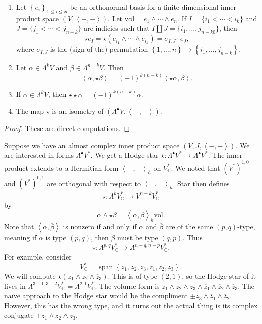 
\begin{proposition}\label{prp:5.0.6}
	\begin{enumerate}
		\item Let $\left\{ e_i \right\} _{1\leq i\leq n} $ be an orthonormal basis for a finite dimensional inner product space $(V,\left\langle -,- \right\rangle )$. Let $\mathrm{vol} =e_1 \wedge \cdots \wedge e_n$. If $I = \{i_1 < \cdots < i_k\}$ and $J = \{ j_1 < \cdots < j_{n-k} \}$ are indicies such that $I\amalg J=\{i_1, \ldots ,j_{n-k0} \}$, then
	\[
		\star e_I = \star \left( e_{i_1} \wedge \cdots \wedge e_{i_k}  \right) =\sigma _{I,J}\cdot  e_J,
	\]
	where $\sigma_{I,J} $ is the (sign of the) permutation $\left\{ 1, \ldots ,n \right\} \to \left\{ i_1, \ldots , j_{n-k}  \right\} $.
	\item Let $\alpha \in \Lambda ^kV$ and $\beta \in \Lambda ^{n-k} V$. Then
	\[
		\left\langle \alpha ,\star \beta  \right\rangle =(-1)^{k(n-k)} \left\langle \star \alpha ,\beta  \right\rangle 
	.\]
	\item If $\alpha \in \Lambda ^{k} V$, then $\star \star \alpha =(-1)^{k(n-k)} \alpha $.
	\item The map $\star $ is an isometry of $(\Lambda ^{\bullet} V,\left\langle -,- \right\rangle )$.
	\end{enumerate}
\end{proposition}
\begin{proof}
	These are direct computations.
\end{proof}


Suppose we have an almost complex inner product space $(V,J,\left\langle -,- \right\rangle )$. We are interested in forms $\Lambda ^{\bullet} V^*$. We get a Hodge star $\star : \Lambda ^{\bullet} V^* \to \Lambda ^{\bullet} V^*$. The inner product extends to a Hermitian form $\left\langle -,- \right\rangle_{h} $ on $V_\mathbb{C} ^*$. We noted that $(V^*)^{1,0} $ and $(V^*)^{0,1} $ are orthogonal with respect to $\left\langle -,- \right\rangle _h$. Star then defines
\[
	\star : \Lambda ^kV^*_{\mathbb{C} }  \to V^{n-k} V^*_\mathbb{C} 
\]
by
\[
	\alpha \wedge \star \beta =\left\langle \alpha ,\overline{\beta }  \right\rangle_h\mathrm{vol} 
.\]
Note that $\left\langle \alpha ,\overline{\beta }  \right\rangle $ is nonzero if and only if $\alpha $ and $\overline{\beta } $ are of the same $(p,q)$-type, meaning if $\alpha $ is type $(p,q)$, then $\beta $ must be type $(q,p)$. Thus
\[
	\star : \Lambda ^{p,q} V_\mathbb{C} ^* \to \Lambda ^{n-q,n-p} V^*_\mathbb{C} 
.\]
For example, consider
\[
	V_\mathbb{C} ^*= \operatorname{span} \left\{ z_1,z_2,z_3, \overline{z} _1,\overline{z} _2,\overline{z} _3 \right\} 
.\]
We will compute $\star (z_1\wedge z_2\wedge \overline{z}_3)$. This is of type $(2,1)$, so the Hodge star of it lives in $\Lambda ^{3-1,3-2} V^*_\mathbb{C} =\Lambda ^{2,1} V^*_\mathbb{C} $. The volume form is $z_1 \wedge z_2 \wedge z_3 \wedge \overline{z} _1 \wedge \overline{z} _2 \wedge \overline{z} _3$. The na\"ive approach to the Hodge star would be the compliment $\pm z_3 \wedge \overline{z} _1 \wedge \overline{z} _2$. However, this has the wrong type, and it turns out the actual thing is its complex conjugate $\pm z_1 \wedge z_2 \wedge \overline{z} _3$.


